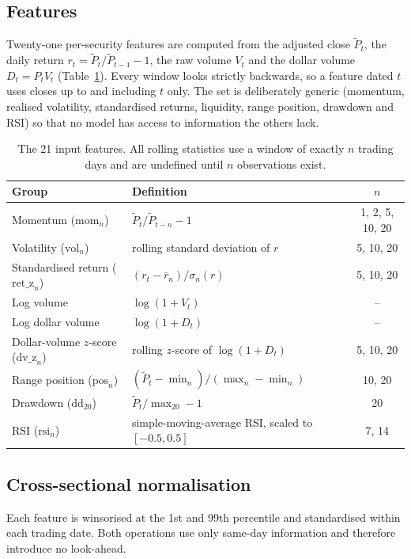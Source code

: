 \subsection{Features}
Twenty-one per-security features are computed from the adjusted close $\tilde P_t$,
the daily return $r_t=\tilde P_t/\tilde P_{t-1}-1$, the raw volume $V_t$ and the
dollar volume $D_t=P_tV_t$ (Table~\ref{tab:features}). Every window looks
strictly backwards, so a feature dated $t$ uses closes up to and including $t$
only. The set is deliberately generic (momentum, realised volatility,
standardised returns, liquidity, range position, drawdown and RSI) so that
no model has access to information the others lack.

\begin{table}[t]
  \centering
  \caption{The 21 input features. All rolling statistics use a window of
  exactly $n$ trading days and are undefined until $n$ observations exist.}
  \label{tab:features}
  \small
  \begin{tabular}{llc}
    \toprule
    Group & Definition & $n$ \\
    \midrule
    Momentum ($\mathrm{mom}_n$) & $\tilde P_t/\tilde P_{t-n}-1$ & 1, 2, 5, 10, 20 \\
    Volatility ($\mathrm{vol}_n$) & rolling standard deviation of $r$ & 5, 10, 20 \\
    Standardised return ($\mathrm{ret\_z}_n$) & $(r_t-\bar r_n)/\sigma_n(r)$ & 5, 10, 20 \\
    Log volume & $\log(1+V_t)$ & -- \\
    Log dollar volume & $\log(1+D_t)$ & -- \\
    Dollar-volume $z$-score ($\mathrm{dv\_z}_n$) & rolling $z$-score of $\log(1+D_t)$ & 5, 10, 20 \\
    Range position ($\mathrm{pos}_n$) & $(\tilde P_t-\min_n)/(\max_n-\min_n)$ & 10, 20 \\
    Drawdown ($\mathrm{dd}_{20}$) & $\tilde P_t/\max_{20}-1$ & 20 \\
    RSI ($\mathrm{rsi}_n$) & simple-moving-average RSI, scaled to $[-0.5,0.5]$ & 7, 14 \\
    \bottomrule
  \end{tabular}
\end{table}

\subsection{Cross-sectional normalisation}
Each feature is winsorised at the 1st and 99th percentile and standardised
within each trading date. Both operations use only same-day information and
therefore introduce no look-ahead.

